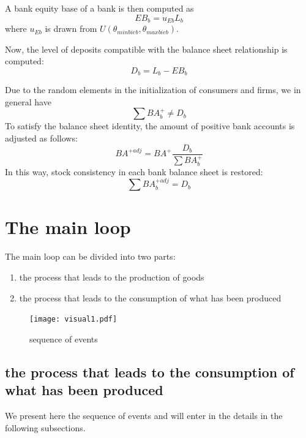 \documentclass{article}
\begin{document}
\vskip5mm
A bank equity base of a bank is then computed as
\[
	EB_b=u_{Eb}L_b
\]
where $u_{Eb}$ is drawn from $U(\theta_{minbieb},\theta_{maxbieb})$.

Now, the level of deposits compatible with the balance sheet relationship is computed:
\[
D_b=L_b-EB_b
\]

Due to the random elements in the initialization of consumers and firms, we in general have
\[
	\sum BA^+_b \neq D_b
\]
To satisfy the balance sheet identity, the amount of positive bank accounts is adjusted as follows:
\[
	BA^{+adj}=BA^+\frac{D_b}{\sum BA^+_b}
\]
In this way, stock consistency in each bank balance sheet is restored:
\[
	\sum BA^{+adj}_b=D_b
\]

\newpage
\section{The main loop}
The main loop can be divided into two parts:
\begin{enumerate}
	\item the process that leads to the production of goods
	\item the process that leads to the consumption of what has been produced
\end{enumerate}

\begin{figure}[htp]
	\centering
\texttt{[image: visual1.pdf]}
	\caption{sequence of events}
	\label{fig:clockcolor}
\end{figure}

\subsection{the process that leads to the consumption of what has been produced}
We present here the sequence of events and will enter in the details in the following subsections.
\end{document}
